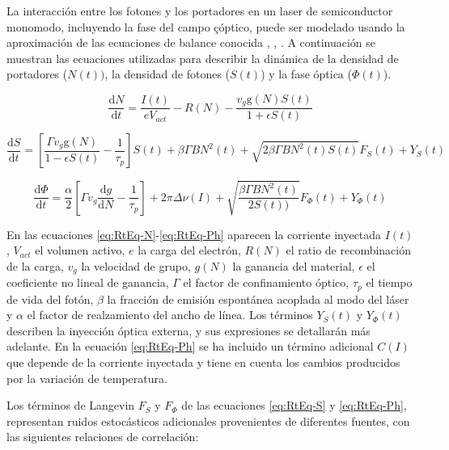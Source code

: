 La interacción entre los fotones y los portadores en un laser de semiconductor monomodo, incluyendo la fase del campo çóptico, puede ser modelado usando la aproximación de las ecuaciones de balance conocida \cite{artSim}, \cite{schunk1986noise}, \cite{fatadin2006numerical}. A continuación se muestran las ecuaciones utilizadas para describir la dinámica de la densidad de portadores ($N(t))$,  la densidad de fotones ($S(t)$) y la fase óptica ($\Phi(t)$).

	\begin{equation}
		\frac{\mathrm{d} N}{\mathrm{d} t} = \frac{I(t)}{e V_{act}} - R(N) - \frac{v_g \textrm{g}(N)S(t)}{1 + \epsilon S(t)} 
		\label{eq:RtEq-N}
	\end{equation}

	\begin{equation}
		\frac{\mathrm{d} S}{\mathrm{d} t} = \left[ \frac{\Gamma v_g \textrm{g}(N)}{1 - \epsilon S(t)} - \frac{1}{\tau_p} \right] S(t) + \beta \Gamma BN^2 (t) + \sqrt{2 \beta \Gamma B N^2(t)S(t)} F_S(t) + Y_S(t)
		\label{eq:RtEq-S}
	\end{equation}

	\begin{equation}
		\frac{\mathrm{d} \Phi}{\mathrm{d} t} = \frac{\alpha}{2}\left[ \Gamma
        v_g \frac{\mathrm{d} g}{\mathrm{d}N} - \frac{1}{\tau_p} \right] + 2\pi\Delta\nu(I) + \sqrt{\frac{\beta \Gamma B N^2(t)}{2 S(t))}} F_{\Phi} (t) + Y_{\Phi}(t)
		\label{eq:RtEq-Ph}
	\end{equation}

	En las ecuaciones \ref{eq:RtEq-N}-\ref{eq:RtEq-Ph} aparecen la corriente inyectada $I(t)$, $V_{act}$ el volumen activo, $e$ la carga del electrón, $R(N)$ el ratio de recombinación de la carga, $v_g$ la velocidad de grupo, $g(N)$ la ganancia del material, $\epsilon$ el coeficiente no lineal de ganancia, $\Gamma$ el factor de confinamiento óptico, $\tau_p$ el tiempo de vida del fotón, $\beta$ la fracción de emisión espontánea acoplada al modo del láser y $\alpha$ el factor de realzamiento del ancho de línea. Los términos $Y_S(t)$ y $Y_{\Phi}(t)$ describen la inyección óptica externa, y sus expresiones se detallarán más adelante. En la ecuación \ref{eq:RtEq-Ph} se ha incluido un término adicional $C(I)$ que depende de la corriente inyectada y tiene en cuenta los cambios producidos por la variación de temperatura.

Los términos de Langevin $F_S$ y $F_{\Phi}$ de las ecuaciones \ref{eq:RtEq-S} y \ref{eq:RtEq-Ph}, representan ruidos estocásticos adicionales provenientes de diferentes fuentes, con las siguientes relaciones de correlación:

